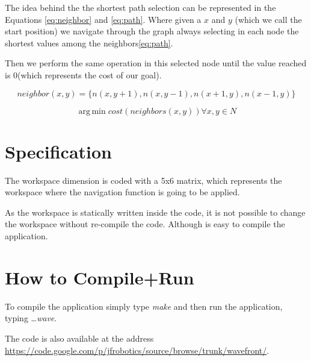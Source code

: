 \documentclass{article}
\begin{document}
The idea behind the the shortest path selection can be represented in the Equations \ref{eq:neighbor} and \ref{eq:path}. Where given a $x$ and $y$ (which we call the start position) we navigate through the graph always selecting in each node the shortest values among the neighbors\ref{eq:path}.

Then we perform the same operation in this selected node until the value reached is 0(which represents the cost of our goal).
 
\begin{equation}
 neighbor(x,y)=\{n(x,y+1),n(x,y-1),n(x+1,y),n(x-1,y)\}
\label{eq:neighbor}
\end{equation}

\begin{equation}
 \operatorname{arg\,min}cost(neighbors(x,y)) \forall x,y \in N
\label{eq:path}
\end{equation}


\section{Specification}

The workspace dimension is coded with a 5x6 matrix, which represents the workspace where the navigation function is going to be applied. 

As the workspace is statically written inside the code, it is not possible to change the workspace without re-compile the code. Although is easy to compile the application.

\section{How to Compile+Run}

To compile the application simply type {\it make} and then run the application, typing \dots \emph{wave}.

The code is also available at the address \url{https://code.google.com/p/jfrobotics/source/browse/trunk/wavefront/}.
\end{document}
